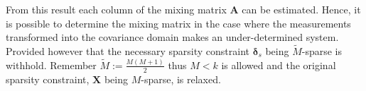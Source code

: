 From this result each column of the mixing matrix $\textbf{A}$ can be estimated. Hence, it is possible to determine the mixing matrix in the case where the measurements transformed into the covariance domain makes an under-determined system.
Provided however that the necessary sparsity constraint $\boldsymbol{\delta}_s$ being $\widetilde{M}$-sparse is withhold. 
Remember $\widetilde{M} := \frac{M(M+1)}{2}$ thus $M<k$ is allowed and the original sparsity constraint, $\textbf{X}$ being $M$-sparse, is relaxed. 





